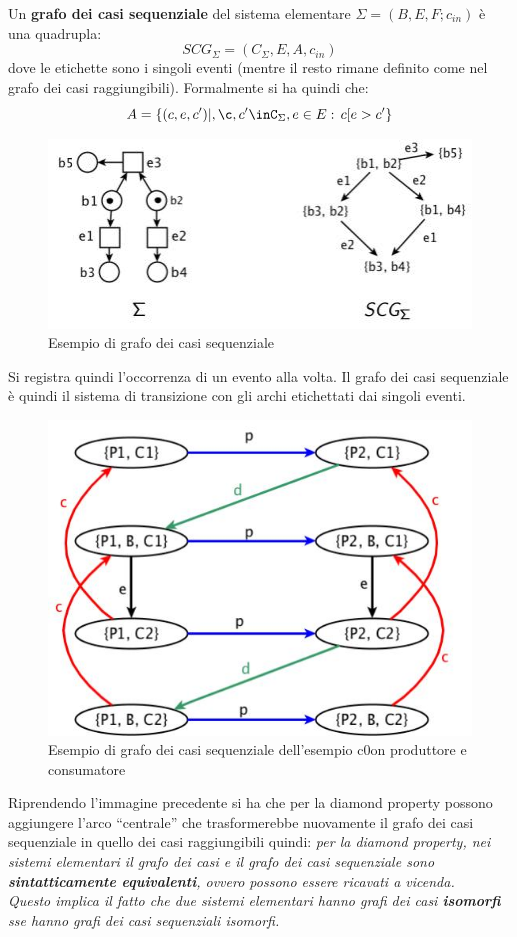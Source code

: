 \documentclass[a4paper,12pt, oneside]{book}
\begin{document}
\begin{definizione}
  Un \textbf{grafo dei casi sequenziale} del sistema elementare
  $\Sigma=(B,E,F;c_{in})$ è una quadrupla:
  \[SCG_\Sigma=(C_\Sigma,E,A,c_{in})\]
  dove le etichette sono i singoli eventi (mentre il resto rimane definito come
  nel grafo dei casi raggiungibili). Formalmente si ha quindi che:
  \[A=\{(c,e,c')|,\c,c'\inC_\Sigma,e\in E:\, c[e>c'\}\]
  \begin{figure}[H]
    \centering
    \includegraphics[scale = 0.5]{img/seq3.jpg}
    \caption{Esempio di grafo dei casi sequenziale}
  \end{figure}
  Si registra quindi l'occorrenza di un evento alla volta. Il grafo dei casi
  sequenziale è quindi il sistema di transizione con gli archi etichettati dai
  singoli eventi.
  \begin{figure}[H]
    \centering
    \includegraphics[scale = 0.4]{img/seqq.jpg}
    \caption{Esempio di grafo dei casi sequenziale dell'esempio c0on produttore
      e consumatore}
  \end{figure}
\end{definizione}
Riprendendo l'immagine precedente si ha che per la diamond property possono
aggiungere l'arco ``centrale'' che trasformerebbe nuovamente il grafo dei casi
sequenziale in quello dei casi raggiungibili quindi:
\textit{per la diamond property, nei sistemi elementari il grafo dei casi e il
  grafo dei casi sequenziale sono \textbf{sintatticamente equivalenti}, ovvero
  possono essere ricavati a vicenda.\\
  Questo implica il fatto che due sistemi elementari hanno grafi dei casi
  \textbf{isomorfi} sse hanno grafi dei casi sequenziali isomorfi.}
\end{document}
